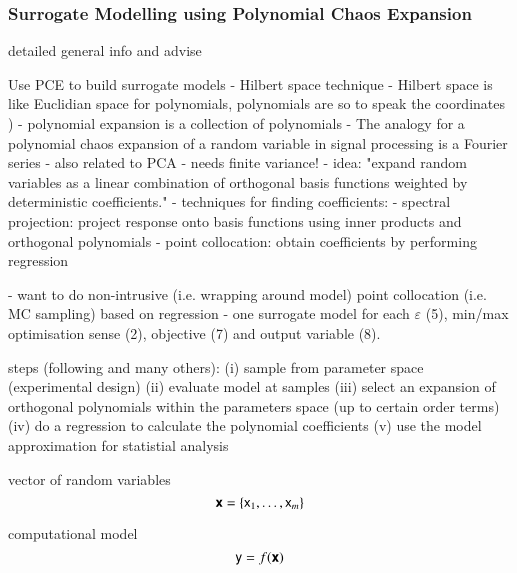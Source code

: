 \subsubsection{Surrogate Modelling using Polynomial Chaos Expansion}

detailed general info and advise
\cite{gratiet_metamodel-based_2015} 
\cite{sudret_global_2008}
\cite{fajraoui_optimal_2017}
\cite{marelli_uqlab_nodate}

Use PCE to build surrogate models \cite{sudret_global_2008}
- Hilbert space technique 
- Hilbert space is like Euclidian space for polynomials, polynomials are so to speak the coordinates \cite{gratiet_metamodel-based_2015})
- polynomial expansion is a collection of polynomials
- The analogy for a polynomial chaos expansion of a random variable in signal processing is a Fourier series \cite{muhlpfordt_uncertainty_2020}
- also related to PCA
- needs finite variance!
- idea: "expand random variables as a linear combination of orthogonal basis functions weighted by deterministic coefficients." \cite{muhlpfordt_uncertainty_2020}
- techniques for finding coefficients:
  - spectral projection: project response onto basis functions using inner products and orthogonal polynomials \cite{palar_multi-fidelity_2016}
  - point collocation: obtain coefficients by performing regression \cite{palar_multi-fidelity_2016,fajraoui_optimal_2017}

- want to do non-intrusive (i.e. wrapping around model) point collocation (i.e. MC sampling) based on regression \cite{ng_multifidelity_2012}
- one surrogate model for each $\varepsilon$ (5), min/max optimisation sense (2), objective (7) and output variable (8).

steps (following \cite{feinberg_chaospy_2015} and many others):
(i) sample from parameter space (experimental design)
(ii) evaluate model at samples
(iii) select an expansion of orthogonal polynomials within the parameters space (up to certain order terms)
(iv) do a regression to calculate the polynomial coefficients
(v) use the model approximation for statistial analysis


vector of random variables
\begin{equation}
    \boldsymbol{\mathsf{x}} = \{\mathsf{x}_1, \dots , \mathsf{x}_m\}
\end{equation}

computational model
\begin{equation}
    \mathsf{y} = f(\boldsymbol{\mathsf{x}})
\end{equation}

